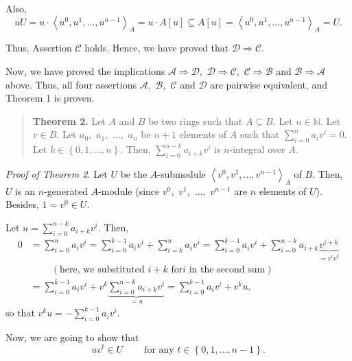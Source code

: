 \documentclass[12pt,final,notitlepage,onecolumn]{article}%
\begin{document}
Also,%
\[
uU=u\cdot\left\langle u^{0},u^{1},...,u^{n-1}\right\rangle _{A}=u\cdot
A\left[  u\right]  \subseteq A\left[  u\right]  =\left\langle u^{0}%
,u^{1},...,u^{n-1}\right\rangle _{A}=U.
\]


Thus, Assertion $\mathcal{C}$ holds. Hence, we have proved that $\mathcal{D}%
\Longrightarrow\mathcal{C}$.

Now, we have proved the implications $\mathcal{A}\Longrightarrow\mathcal{D},$
$\mathcal{D}\Longrightarrow\mathcal{C},$ $\mathcal{C}\Longrightarrow
\mathcal{B}$ and $\mathcal{B}\Longrightarrow\mathcal{A}$ above. Thus, all four
assertions $\mathcal{A},$ $\mathcal{B},$ $\mathcal{C}$ and $\mathcal{D}$ are
pairwise equivalent, and Theorem 1 is proven.

\begin{quote}
\textbf{Theorem 2.} Let $A$ and $B$ be two rings such that $A\subseteq B$. Let
$n\in\mathbb{N}$. Let $v\in B$. Let $a_{0},$ $a_{1},$ $...,$ $a_{n}$ be $n+1$
elements of $A$ such that $\sum\limits_{i=0}^{n}a_{i}v^{i}=0$. Let
$k\in\left\{  0,1,...,n\right\}  $. Then, $\sum\limits_{i=0}^{n-k}a_{i+k}%
v^{i}$ is $n$-integral over $A$.
\end{quote}

\textit{Proof of Theorem 2.} Let $U$ be the $A$-submodule $\left\langle
v^{0},v^{1},...,v^{n-1}\right\rangle _{A}$ of $B$. Then, $U$ is an
$n$-generated $A$-module (since $v^{0},$ $v^{1},$ $...,$ $v^{n-1}$ are $n$
elements of $U$). Besides, $1=v^{0}\in U$.

Let $u=\sum\limits_{i=0}^{n-k}a_{i+k}v^{i}$. Then,%
\begin{align*}
0  &  =\sum\limits_{i=0}^{n}a_{i}v^{i}=\sum\limits_{i=0}^{k-1}a_{i}v^{i}%
+\sum\limits_{i=k}^{n}a_{i}v^{i}=\sum\limits_{i=0}^{k-1}a_{i}v^{i}%
+\sum\limits_{i=0}^{n-k}a_{i+k}\underbrace{v^{i+k}}_{=v^{i}v^{k}}\\
&  \ \ \ \ \ \ \ \ \ \ \left(  \text{here, we substituted }i+k\text{ for
}i\text{\ in the second sum}\right) \\
&  =\sum\limits_{i=0}^{k-1}a_{i}v^{i}+v^{k}\underbrace{\sum\limits_{i=0}%
^{n-k}a_{i+k}v^{i}}_{=u}=\sum\limits_{i=0}^{k-1}a_{i}v^{i}+v^{k}u,
\end{align*}
so that $v^{k}u=-\sum\limits_{i=0}^{k-1}a_{i}v^{i}$.

Now, we are going to show that%
\begin{equation}
uv^{t}\in U\ \ \ \ \ \ \ \ \ \ \text{for any }t\in\left\{
0,1,...,n-1\right\}  . \label{2}%
\end{equation}
\end{document}

